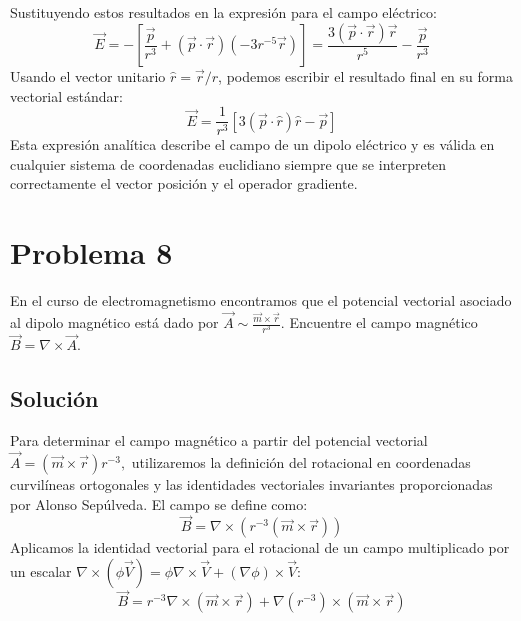 \documentclass[a4paper]{article}
\begin{document}
Sustituyendo estos resultados en la expresión para el campo eléctrico:
\begin{equation}
\vec{E} = - \left[ \frac{\vec{p}}{r^3} + (\vec{p} \cdot \vec{r})(-3 r^{-5} \vec{r}) \right] = \frac{3(\vec{p} \cdot \vec{r})\vec{r}}{r^5} - \frac{\vec{p}}{r^3}
\end{equation}
Usando el vector unitario $\hat{r} = \vec{r}/r$, podemos escribir el resultado final en su forma vectorial estándar:
\begin{equation}
\vec{E} = \frac{1}{r^3} \left[ 3(\vec{p} \cdot \hat{r})\hat{r} - \vec{p} \right]
\end{equation}
Esta expresión analítica describe el campo de un dipolo eléctrico y es válida en cualquier sistema de coordenadas euclidiano siempre que se interpreten correctamente el vector posición y el operador gradiente.

\section{Problema 8}
En el curso de electromagnetismo encontramos que el potencial vectorial asociado al dipolo magnético está dado por $\vec{A} \sim \frac{\vec{m}\times\vec{r}}{r^3}$. Encuentre el campo magnético $\vec{B} = \nabla\times \vec{A}.$

\subsection{Solución}

Para determinar el campo magnético a partir del potencial vectorial $\vec{A} = (\vec{m} \times \vec{r})r^{-3},$ utilizaremos la definición del rotacional en coordenadas curvilíneas ortogonales y las identidades vectoriales invariantes proporcionadas por Alonso Sepúlveda. El campo se define como:
\begin{equation}
\vec{B} = \nabla \times \left( r^{-3} (\vec{m} \times \vec{r}) \right)
\end{equation}
Aplicamos la identidad vectorial para el rotacional de un campo multiplicado por un escalar $\nabla \times (\phi \vec{V}) = \phi \nabla \times \vec{V} + (\nabla \phi) \times \vec{V}$:
\begin{equation}
\vec{B} = r^{-3} \nabla \times (\vec{m} \times \vec{r}) + \nabla(r^{-3}) \times (\vec{m} \times \vec{r})
\end{equation}
\end{document}
